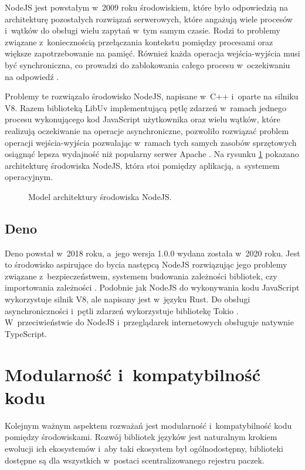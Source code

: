 NodeJS jest powstałym w~2009 roku środowiskiem, które było odpowiedzią na architekturę pozostałych rozwiązań serwerowych, które angażują wiele procesów i~wątków do obsługi wielu zapytań w~tym samym czasie. Rodzi to problemy związane z~koniecznością przełączania kontekstu pomiędzy procesami oraz większe zapotrzebowanie na pamięć. Również każda operacja wejścia-wyjścia musi być synchroniczna, co prowadzi do zablokowania całego procesu w~oczekiwaniu na odpowiedź \cite{nodejs}.

Problemy te rozwiązało środowisko NodeJS, napisane w~C++ i~oparte na silniku V8. Razem biblioteką LibUv \cite{libuv} implementującą pętlę zdarzeń w~ramach jednego procesu wykonującego kod JavaScript użytkownika oraz wielu wątków, które realizują oczekiwanie na operacje asynchroniczne, pozwoliło rozwiązać problem operacji wejścia-wyjścia pozwalając w~ramach tych samych zasobów sprzętowych osiągnąć lepsza wydajność niż popularny serwer Apache \cite{node-apache}. Na rysunku \ref{fig:nodejs} pokazano architekturę środowiska NodeJS, która stoi pomiędzy aplikacją, a~systemem operacyjnym.

\begin{figure}
    \centering
     
    \caption{Model architektury środowiska NodeJS.}
    \label{fig:nodejs}
\end{figure}

\subsection{Deno}

Deno powstał w~2018 roku, a~jego wersja 1.0.0 wydana została w~2020 roku. Jest to środowisko aspirujące do bycia następcą NodeJS rozwiązując jego problemy związane z~bezpieczeństwem, systemem budowania zależności bibliotek, czy importowania zależności \cite{deno}. Podobnie jak NodeJS do wykonywania kodu JavaScript wykorzystuje silnik V8, ale napisany jest w~języku Rust. Do obsługi asynchroniczności i~pętli zdarzeń wykorzystuje bibliotekę Tokio \cite{tokio}. W~przeciwieństwie do NodeJS i~przeglądarek internetowych obsługuje natywnie TypeScript.

\section{Modularność i~kompatybilność kodu}

Kolejnym ważnym aspektem rozważań jest modularność i~kompatybilność kodu pomiędzy środowiskami. Rozwój bibliotek języków jest naturalnym krokiem ewolucji ich ekosystemów i~aby taki ekosystem był ogólnodostępny, biblioteki dostępne są dla wszystkich w~postaci scentralizowanego rejestru paczek. 

